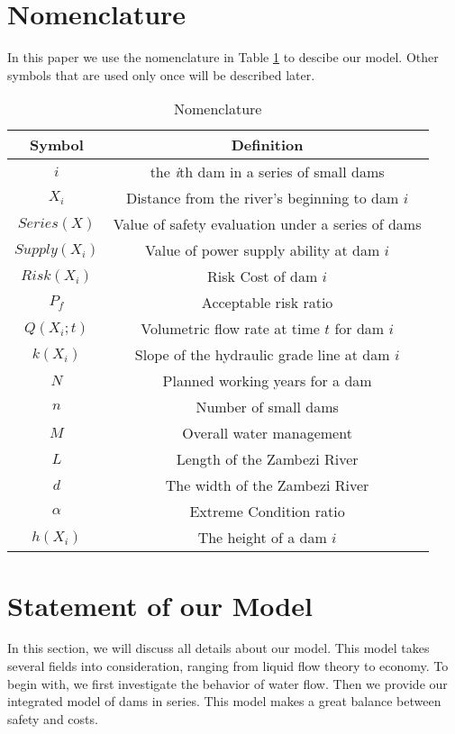 \documentclass{mcmthesis}
\begin{document}
\section{Nomenclature}\label{Sec-Nomen}
In this paper we use the nomenclature in Table \ref{tab:Nomen} to descibe our model. Other symbols that are used only once will be described later.
\begin{table}
    \centering
    \caption{Nomenclature}
    \label{tab:Nomen}
    \begin{tabular}{c c}
\hline
    	Symbol & Definition\\
\hline
	$i$ & the \emph{i}th dam in a series of small dams\\
	$X_i$ & Distance from the river's beginning to dam $i$\\
	$Series(X)$ & Value of safety evaluation under a series of dams\\
	$Supply(X_i)$ & Value of power supply ability at dam $i$\\
	$Risk(X_i)$ & Risk Cost of dam $i$\\
	$P_f$ & Acceptable risk ratio\\
	$Q(X_i;t)$ & Volumetric flow rate at time $t$ for dam $i$\\
	$k(X_i)$ & Slope of the hydraulic grade line at dam $i$\\
	$N$ & Planned working years for a dam\\
	$n$ & Number of small dams\\
	$M$ & Overall water management\\
	$L$ & Length of the Zambezi River\\
	$d$ & The width of the Zambezi River\\
	$\alpha$& Extreme Condition ratio\\
	$h(X_i)$ & The height of a dam $i$\\
\hline
    \end{tabular}
\end{table}
\section{Statement of our Model} \label{Sec-Model}
In this section, we will discuss all details about our model. This model takes several fields into consideration, ranging from liquid flow theory to economy. To begin with, we first investigate the behavior of water flow. Then we provide our integrated model of dams in series. This model makes a great balance between safety and costs.
\end{document}
